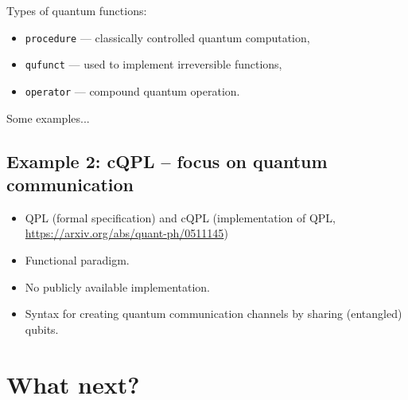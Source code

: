 \documentclass{beamer}
\begin{document}
\begin{frame}{\insertsection}{\insertsubsection}
    Types of quantum functions:
    \begin{itemize}
        \item<1-> \texttt{procedure} ---  classically controlled quantum 
        computation,
        \item<2-> \texttt{qufunct} --- used to implement irreversible functions,
        \item<3-> \texttt{operator} --- compound quantum operation.
    \end{itemize}
\end{frame}

\begin{frame}{\insertsection}{\insertsubsection}
Some examples...
\end{frame}

\subsection{Example 2: cQPL -- focus on quantum communication}

\begin{frame}{\insertsection}{\insertsubsection}
    
    \begin{itemize}
        \item<1-> QPL (formal specification) and cQPL (implementation of QPL, 
        \url{https://arxiv.org/abs/quant-ph/0511145})
        \item<2-> Functional paradigm.
        \item<3-> No publicly available implementation.
        \item<4-> Syntax for creating quantum communication channels by sharing 
        (entangled) qubits.
    \end{itemize}
\end{frame}

\section{What next?}
\end{document}
